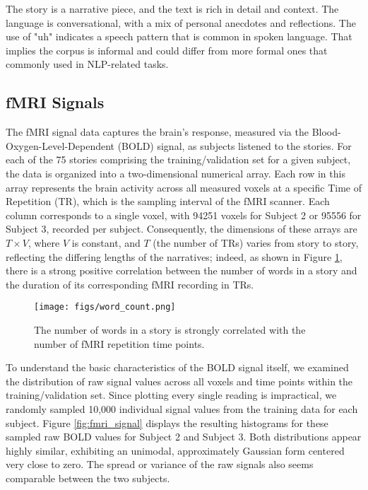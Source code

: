 \documentclass[10pt,letterpaper]{article}
\begin{document}
The story is a narrative piece, and the text is rich in detail and context. The language is conversational, with a mix of personal anecdotes and reflections. The use of "uh" indicates a speech pattern that is common in spoken language. That implies the corpus is informal and could differ from more formal ones that commonly used in NLP-related tasks.

\subsection{fMRI Signals}
The fMRI signal data captures the brain's response, measured via the Blood-Oxygen-Level-Dependent (BOLD) signal, as subjects listened to the stories. For each of the 75 stories comprising the training/validation set for a given subject, the data is organized into a two-dimensional numerical array. Each row in this array represents the brain activity across all measured voxels at a specific Time of Repetition (TR), which is the sampling interval of the fMRI scanner. Each column corresponds to a single voxel, with 94251 voxels for Subject 2 or 95556 for Subject 3, recorded per subject. Consequently, the dimensions of these arrays are \(T \times V\), where \(V\) is constant, and \(T\) (the number of TRs) varies from story to story, reflecting the differing lengths of the narratives; indeed, as shown in Figure \ref{fig:word_count}, there is a strong positive correlation between the number of words in a story and the duration of its corresponding fMRI recording in TRs.

\begin{figure}[ht]
    \centering
    \texttt{[image: figs/word\_count.png]}
    \caption{The number of words in a story is strongly correlated with the number of fMRI repetition time points.}
    \label{fig:word_count}
\end{figure}

To understand the basic characteristics of the BOLD signal itself, we examined the distribution of raw signal values across all voxels and time points within the training/validation set. Since plotting every single reading is impractical, we randomly sampled 10,000 individual signal values from the training data for each subject. Figure \ref{fig:fmri_signal} displays the resulting histograms for these sampled raw BOLD values for Subject 2 and Subject 3. Both distributions appear highly similar, exhibiting an unimodal, approximately Gaussian form centered very close to zero. The spread or variance of the raw signals also seems comparable between the two subjects.
\end{document}
